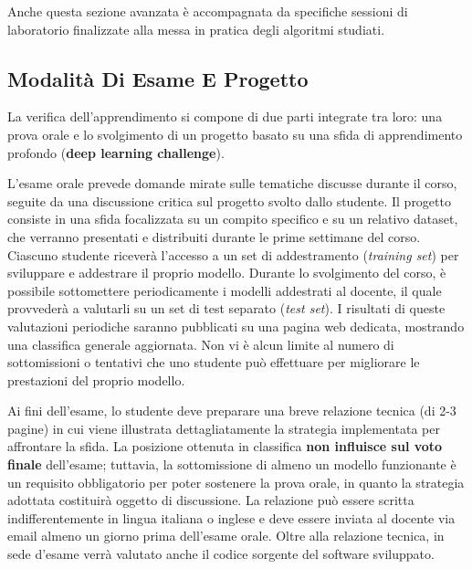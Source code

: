 ﻿\documentclass[11pt, a4paper]{article}
\begin{document}
Anche questa sezione avanzata è accompagnata da specifiche sessioni di laboratorio finalizzate alla messa in pratica degli algoritmi studiati.

\newpage

\subsection{Modalità Di Esame E Progetto}

La verifica dell'apprendimento si compone di due parti integrate tra loro: una prova orale e lo svolgimento di un progetto basato su una sfida di apprendimento profondo (\textbf{deep learning challenge}).

L'esame orale prevede domande mirate sulle tematiche discusse durante il corso, seguite da una discussione critica sul progetto svolto dallo studente.
Il progetto consiste in una sfida focalizzata su un compito specifico e su un relativo dataset, che verranno presentati e distribuiti durante le prime settimane del corso. Ciascuno studente riceverà l'accesso a un set di addestramento (\emph{training set}) per sviluppare e addestrare il proprio modello. Durante lo svolgimento del corso, è possibile sottomettere periodicamente i modelli addestrati al docente, il quale provvederà a valutarli su un set di test separato (\emph{test set}). I risultati di queste valutazioni periodiche saranno pubblicati su una pagina web dedicata, mostrando una classifica generale aggiornata. Non vi è alcun limite al numero di sottomissioni o tentativi che uno studente può effettuare per migliorare le prestazioni del proprio modello.


Ai fini dell'esame, lo studente deve preparare una breve relazione tecnica (di 2-3 pagine) in cui viene illustrata dettagliatamente la strategia implementata per affrontare la sfida. La posizione ottenuta in classifica \textbf{non influisce sul voto finale} dell'esame; tuttavia, la sottomissione di almeno un modello funzionante è un requisito obbligatorio per poter sostenere la prova orale, in quanto la strategia adottata costituirà oggetto di discussione. La relazione può essere scritta indifferentemente in lingua italiana o inglese e deve essere inviata al docente via email almeno un giorno prima dell'esame orale. Oltre alla relazione tecnica, in sede d'esame verrà valutato anche il codice sorgente del software sviluppato.
\end{document}
